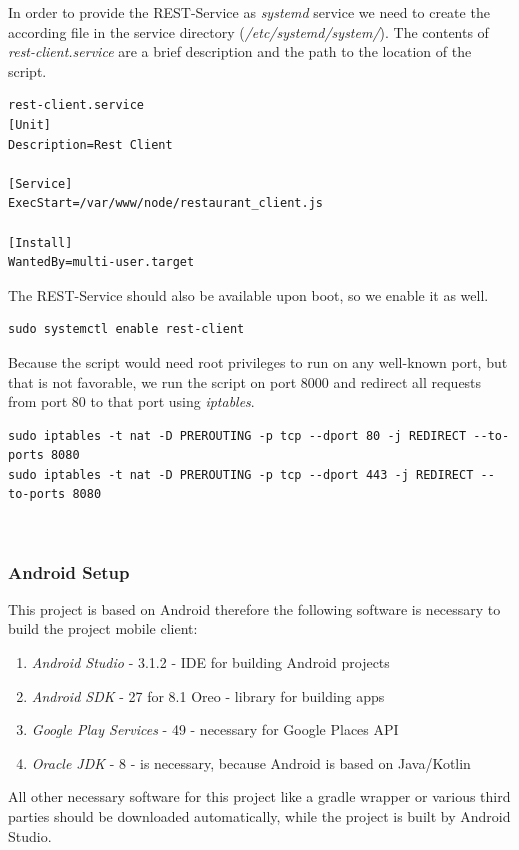 In order to provide the REST-Service as \textit{systemd} service we need to create the according file in the service directory (\textit{/etc/systemd/system/}). The contents of \textit{rest-client.service} are a brief description and the path to the location of the script.
\begin{lstlisting}
rest-client.service
[Unit]
Description=Rest Client

[Service]
ExecStart=/var/www/node/restaurant_client.js

[Install]
WantedBy=multi-user.target
\end{lstlisting}

The REST-Service should also be available upon boot, so we enable it as well.
\begin{lstlisting}
sudo systemctl enable rest-client
\end{lstlisting}

Because the script would need root privileges to run on any well-known port, but that is not favorable, we run the script on port 8000 and redirect all requests from port 80 to that port using \textit{iptables}.
\begin{lstlisting}
sudo iptables -t nat -D PREROUTING -p tcp --dport 80 -j REDIRECT --to-ports 8080
sudo iptables -t nat -D PREROUTING -p tcp --dport 443 -j REDIRECT --to-ports 8080
\end{lstlisting}

\


\subsubsection{Android Setup}
\label{sec:Android-Setup}
This project is based on Android therefore the following software is necessary to build the project mobile client:

\begin{enumerate}
	\item \textit{Android Studio} - 3.1.2 - IDE for building Android projects
	\item \textit{Android SDK} - 27 for 8.1 Oreo - library for building apps
	\item \textit{Google Play  Services} - 49 - necessary for Google Places API
	\item \textit{Oracle JDK} - 8 - is necessary, because Android is based on Java/Kotlin
\end{enumerate}

All other necessary software for this project like a gradle wrapper or various third parties should be downloaded automatically, while the project is built by Android Studio.


